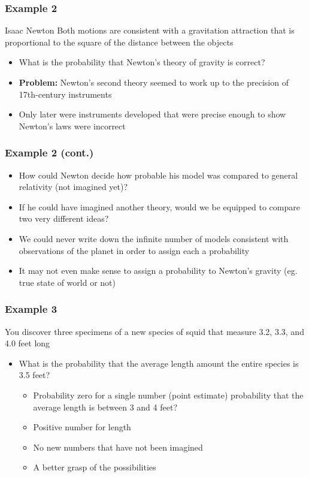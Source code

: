 \documentclass[12pt, block=fill]{beamer}
\begin{document}
\begin{frame}
  \frametitle{Example 2}
  \begin{exampleblock}{Isaac Newton}
    Both motions are consistent with a gravitation attraction that is proportional to the square of the distance between the objects
  \end{exampleblock}
    \begin{itemize}
        \item What is the probability that Newton's theory of gravity is correct?
        \item \textbf{Problem:} Newton's second theory seemed to work up to the precision of 17th-century instruments
        \item Only later were instruments developed that were precise enough to show Newton's laws were incorrect
    \end{itemize}
    
\end{frame}

\begin{frame}
  \frametitle{Example 2 (cont.)}

  \begin{itemize}

    \item How could Newton decide how probable his model was compared to general relativity (not imagined yet)?
    \item If he could have imagined another theory, would we be equipped to compare two very different ideas?
     \item We could never write down the infinite number of models consistent with observations of the planet in order to assign each a probability
    \item It may not even make sense to assign a probability to Newton's gravity (eg. true state of world or not)
  \end{itemize}
\end{frame}

\begin{frame}
  \frametitle{Example 3}
  You discover three specimens of a new species of squid that measure 3.2, 3.3, and 4.0 feet long
  \begin{itemize}
  \item What is the probability that the average length amount the entire species is 3.5 feet?
  
    \begin{itemize}
      \item Probability zero for a single number (point estimate)
  probability that the average length is between 3 and 4 feet?
        \item Positive number for length
        \item No new numbers that have not been imagined
        \item A better grasp of the possibilities
    \end{itemize}
  \end{itemize}
\end{frame}
\end{document}
